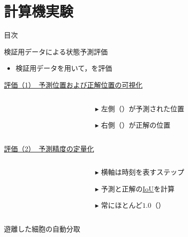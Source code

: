 \section{計算機実験}

\begin{frame}[noframenumbering]{目次}
    \tableofcontents[currentsection]
\end{frame}

\begin{frame}{検証用データによる状態予測評価}
    \begin{itemize}
        \item 検証用データを用いて，を評価
    \end{itemize}
    \vspace{0.5zh}
    \uline{評価（1）　予測位置および正解位置の可視化}
    \begin{columns}
        \begin{column}{.6\linewidth}
        \end{column}
        \begin{column}{.4\linewidth}
            \begin{itemize}
                \item[$\blacktriangleright$] 左側（）が予測された位置
                \item[$\blacktriangleright$] 右側（）が正解の位置
            \end{itemize}
        \end{column}
    \end{columns}
    \uline{評価（2）　予測精度の定量化}
    \begin{columns}
        \begin{column}{.6\linewidth}
        \end{column}
        \begin{column}{.4\linewidth}
            \vspace{-2.5zh}
            \begin{itemize}
                \item[$\blacktriangleright$] 横軸は時刻を表すステップ
                \item[$\blacktriangleright$] 予測と正解の\uline{IoU}を計算
                \item[$\blacktriangleright$] 常にほとんど$1.0$（）
            \end{itemize}
        \end{column}
    \end{columns}
\end{frame}

\begin{frame}{遊離した細胞の自動分取}
    
\end{frame}
